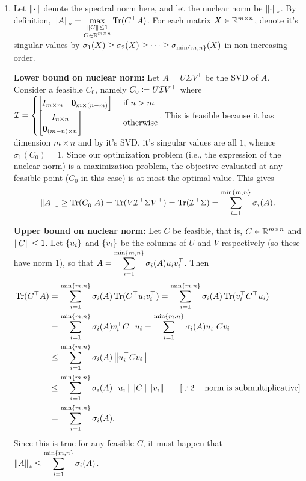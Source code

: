 \soln

\begin{enumerate}[leftmargin=*]
\item Let $\left\lVert \cdot \right\rVert_{}$ denote the spectral norm here, and let the nuclear norm be $\left\lVert \cdot \right\rVert_{*}$. By definition, $\displaystyle\left\lVert A \right\rVert_{*} = \max_{\substack{\left\lVert C \right\rVert_{}\le 1 \\ C\in \mathbb{R}^{m\times n}}} \operatorname{Tr}(C^{\top}A)$. For each matrix $X\in\mathbb{R}^{m\times n}$, denote it's singular values by $\sigma_{1}(X) \ge \sigma_{2}(X)\ge \cdots \ge \sigma_{\min\left\{m,n\right\}}(X)$ in non-increasing order. 

\textbf{Lower bound on nuclear norm:} Let $A = U\Sigma V^{\top}$ be the SVD of $A$. Consider a feasible $C_{0}$, namely $C_{0} \coloneqq U {\mathcal{I}} V^{\top}$ where ${\mathcal{I}} = \begin{cases} \begin{bmatrix}I_{m\times m} & \pmb 0_{m\times (n-m)} \end{bmatrix}& \text{ if } n > m\\
\begin{bmatrix}I_{n\times n} \\ \pmb 0_{(m-n)\times n} \end{bmatrix}& \text{ otherwise}
\end{cases}$. This is feasible because it has dimension $m\times n$ and by it's SVD, it's singular values are all $1$, whence $\sigma_{1}(C_{0})=1$. Since our optimization problem (i.e., the expression of the nuclear norm) is a maximization problem, the objective evaluated at any feasible point ($C_{0}$ in this case) is at most the optimal value. This gives $$\left\lVert A \right\rVert_{*} \ge \operatorname{Tr}(C_{0}^{\top}A) = \operatorname{Tr}(V {\mathcal{I}}^{\top} \Sigma V^{\top}) = \operatorname{Tr}({\mathcal{I}}^{\top}\Sigma) = \sum_{i=1}^{\min\left\{m,n\right\}}\sigma_{i}(A).$$ 

\textbf{Upper bound on nuclear norm:} Let $C$ be feasible, that is, $C\in\mathbb{R}^{m\times n}$ and $\left\lVert C \right\rVert_{}\le 1$. Let $\left\{u_{i}\right\}$ and $\left\{v_{i}\right\}$ be the columns of $U$ and $V$ respectively (so these have norm $1$), so that $\displaystyle A = \sum_{i=1}^{\min\left\{m,n\right\}} \sigma_{i}(A)u_{i}v_{i}^{\top}$. Then \begin{align*}
\operatorname{Tr}(C^{\top}A) & = \sum_{i=1}^{\min\left\{m,n\right\}} \sigma_{i}(A) \operatorname{Tr}(C^{\top}u_{i}v_{i}^{\top}) = \sum_{i=1}^{\min\left\{m,n\right\}} \sigma_{i}(A) \operatorname{Tr}(v_{i}^{\top}C^{\top}u_{i})\\
&= \sum_{i=1}^{\min\left\{m,n\right\}} \sigma_{i}(A) v_{i}^{\top}C^{\top}u_{i} = \sum_{i=1}^{\min\left\{m,n\right\}} \sigma_{i}(A) u_{i}^{\top}Cv_{i}\\
&\le \sum_{i=1}^{\min\left\{m,n\right\}} \sigma_{i}(A) \left\lVert u_{i}^{\top}Cv_{i} \right\rVert_{}\\
&\le \sum_{i=1}^{\min\left\{m,n\right\}} \sigma_{i}(A) \left\lVert u_{i} \right\rVert_{}\left\lVert C \right\rVert_{}\left\lVert v_{i} \right\rVert_{} ~~~~~[\because 2-\text{norm is submultiplicative}]\\
&= \sum_{i=1}^{\min\left\{m,n\right\}} \sigma_{i}(A).
\end{align*}
Since this is true for any feasible $C$, it must happen that $\left\lVert A \right\rVert_{*} \le \displaystyle \sum_{i=1}^{\min\left\{m,n\right\}} \sigma_{i}(A)$.


\end{enumerate}

